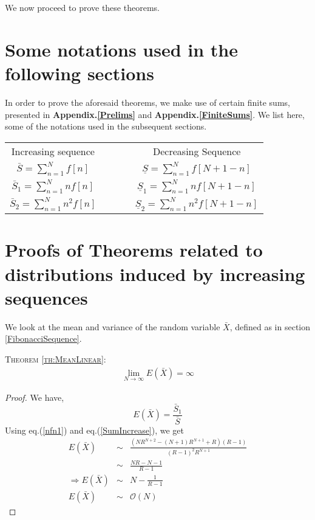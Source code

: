\begin{multicols}{2}
\begin{thm}
 \end{thm}

We now proceed to prove these theorems.

\section{Some notations used in the following sections}\label{section-5}
In order to prove the aforesaid theorems, we make use of certain finite sums, presented in \textbf{Appendix.\ref{Prelims}} and \textbf{Appendix.\ref{FiniteSums}}. We list here, some of the notations used in the subsequent sections.
\begin{tabular}{cccc}
  Increasing sequence & ~ &~& Decreasing Sequence\\[.2cm]
 $\bar{S} = \displaystyle{\sum_{n=1}^{N}}f[n]$& ~ &~& $\underline{S} = \displaystyle{\sum_{n=1}^{N}}f[N+1-n]$ \\
 $\bar{S}_1 = \displaystyle{\sum_{n=1}^{N}}n f[n]$ & ~ &~& $\underline{S}_1 = \displaystyle{\sum_{n=1}^{N}}n f[N+1-n]$ \\
 $\bar{S}_2 = \displaystyle{\sum_{n=1}^{N}}n^2 f[n]$ &~& ~&$\underline{S}_2 = \displaystyle{\sum_{n=1}^{N}}n^2 f[N+1-n]$ 
\end{tabular}

\section{Proofs of Theorems related to distributions induced by increasing sequences}\label{section-6}

We look at the mean and variance of the random variable $\bar{X}$, defined as in section \ref{FibonacciSequence}.

\textsc{Theorem {\ref{th:MeanLinear}}:}
\begin{eqnarray*}
\displaystyle{\lim_{N \rightarrow \infty}} E(\bar{X}) = \infty  
 \end{eqnarray*}
\begin{proof}
We have,
\begin{equation}
E(\bar{X}) = \frac{\bar{S}_1}{\bar{S}}\label{eq-6.1}
\end{equation}
Using eq.(\ref{nfn1}) and eq.(\ref{SumIncrease}), we get
\begin{eqnarray}
E(\bar{X})&\sim& \frac{(NR^{N+2}-(N+1)R^{N+1}+R)(R-1)}{(R-1)^2 R^{N+1}}\nonumber\\
&\sim& \frac{NR-N-1}{R-1}\nonumber\\
\Rightarrow E(\bar{X}) &\sim& N - \frac{1}{R-1}\\\label{eq-6.2}
\nonumber E(\bar{X}) &\sim& \mathcal{O}(N)
\end{eqnarray}
\end{proof}


\end{multicols}
